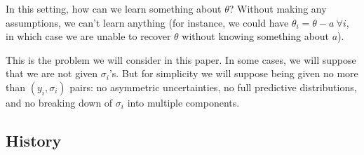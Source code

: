 \documentclass[letterpaper,12pt]{article}
\begin{document}
In this setting, how can we learn something about $\theta$? Without making any assumptions, we can't learn anything (for instance, we could have $\theta_i=\theta-a\ \forall i$, in which case we are unable to recover $\theta$ without knowing something about $a$).

This is the problem we will consider in this paper. In some cases, we will suppose that we are not given $\sigma_i$'s. But for simplicity we will suppose being given no more than $(y_i,\sigma_i)$ pairs: no asymmetric uncertainties, no full predictive distributions, and no breaking down of $\sigma_i$ into multiple components.

\subsection{History}\label{sec:history}
\end{document}
